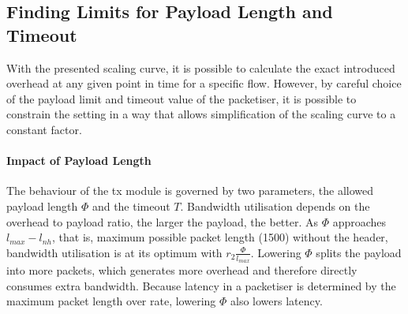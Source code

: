 \subsection{Finding Limits for Payload Length and Timeout}
With the presented scaling curve, it is possible to calculate the exact introduced overhead at any given point in time for a specific flow.
However, by careful choice of the payload limit and timeout value of the packetiser, it is possible to constrain the setting in a way that allows simplification of the scaling curve to a constant factor.
\paragraph{Impact of Payload Length}
The behaviour of the \gls{tx} module is governed by two parameters, the allowed payload length
$\Phi $ and the timeout $T$. Bandwidth utilisation depends on the overhead to payload ratio, the larger the payload, the better. 
As $\Phi$ approaches $l_{max} - l_{nh}$, that is, maximum possible packet length (\SI{1500}{\byte}) without the header, bandwidth utilisation is at its optimum with $r_2\frac{\Phi}{l_{max}}$. 
Lowering $\Phi$ splits the payload into more packets, which generates more overhead
and therefore directly consumes extra bandwidth. Because latency in a packetiser is determined by the maximum packet length over rate, lowering $\Phi$ also lowers latency.
